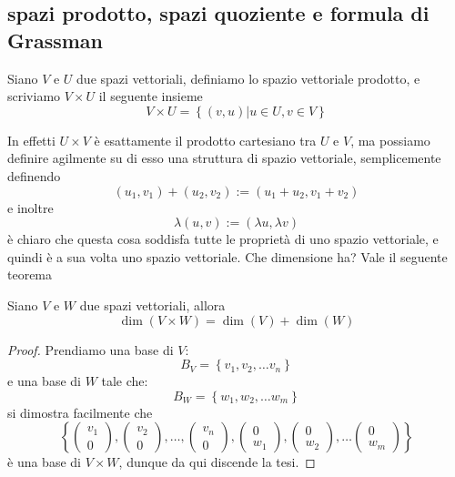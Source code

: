 \documentclass[11pt]{scrartcl}
\begin{document}
	\subsection{spazi prodotto, spazi quoziente e formula di Grassman}
	\begin{definition}
		Siano $V$ e $U$ due spazi vettoriali, definiamo lo spazio vettoriale prodotto, e scriviamo $V\times U$ il seguente insieme
		$$V\times U=\left\{(v,u)|u\in U,v\in V\right\}$$
	\end{definition}
	In effetti $U\times V$ è esattamente il prodotto cartesiano tra $U$ e $V$, ma possiamo definire agilmente su di esso una struttura di spazio vettoriale, semplicemente definendo
	$$(u_1,v_1)+(u_2,v_2):=(u_1+u_2,v_1+v_2)$$
	e inoltre
	$$\lambda(u,v):=(\lambda u, \lambda v)$$
	è chiaro che questa cosa soddisfa tutte le proprietà di uno spazio vettoriale, e quindi è a sua volta uno spazio vettoriale. Che dimensione ha? Vale il seguente teorema
	\begin{lemma}
		Siano $V$ e $W$ due spazi vettoriali, allora
		$$\dim(V\times W)=\dim(V)+\dim(W)$$
	\end{lemma}
	\begin{proof}
		Prendiamo una base di $V$:
		$$B_V=\left\{v_1,v_2,\dots v_n\right\}$$
		e una base di $W$ tale che:
		$$B_W=\left\{w_1,w_2,\dots w_m\right\}$$
		si dimostra facilmente che 
		$$\left\{
		\begin{pmatrix}
			v_1 \\
			0
		\end{pmatrix},
		\begin{pmatrix}
			v_2 \\
			0
		\end{pmatrix}, \dots, 
		\begin{pmatrix}
			v_n \\
			0
		\end{pmatrix},
		\begin{pmatrix}
			0 \\
			w_1
		\end{pmatrix},
		\begin{pmatrix}
			0 \\
			w_2
		\end{pmatrix},
		\dots
		\begin{pmatrix}
			0 \\
			w_m
		\end{pmatrix}
		\right\}$$
		è una base di $V\times W$, dunque da qui discende la tesi.
	\end{proof}
\end{document}
